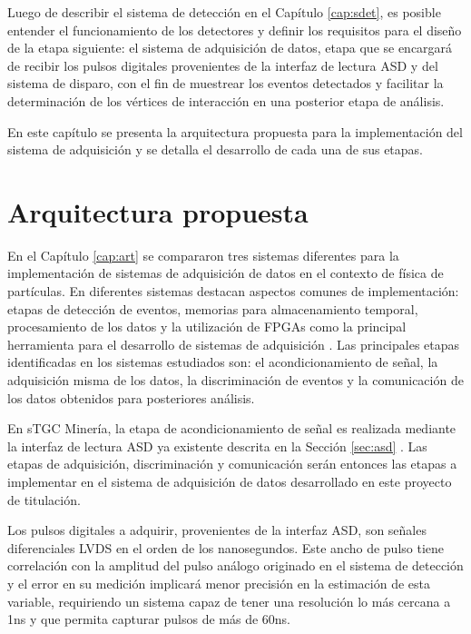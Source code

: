 Luego de describir el sistema de detección en el Capítulo \ref{cap:sdet}, es posible entender el funcionamiento de los detectores y definir los requisitos para el diseño de la etapa siguiente: el sistema de adquisición de datos, etapa que se encargará de recibir los pulsos digitales provenientes de la interfaz de lectura ASD y del sistema de disparo, con el fin de muestrear los eventos detectados y facilitar la determinación de los vértices de interacción en una posterior etapa de análisis.

En este capítulo se presenta la arquitectura propuesta para la implementación del sistema de adquisición y se detalla el desarrollo de cada una de sus etapas.

\section{Arquitectura propuesta}
\label{sec:arq}

	En el Capítulo \ref{cap:art} se compararon tres sistemas diferentes para la implementación de sistemas de adquisición de datos en el contexto de física de partículas. En diferentes sistemas destacan aspectos comunes de implementación: etapas de detección de eventos, memorias para almacenamiento temporal, procesamiento de los datos y la utilización de FPGAs como la principal herramienta para el desarrollo de sistemas de adquisición . Las principales etapas identificadas en los sistemas estudiados son: el acondicionamiento de señal, la adquisición misma de los datos, la discriminación de eventos y la comunicación de los datos obtenidos para posteriores análisis.
	
	En sTGC Minería, la etapa de acondicionamiento de señal es realizada mediante la interfaz de lectura ASD ya existente descrita en la Sección \ref{sec:asd} . Las etapas de adquisición, discriminación y comunicación serán entonces las etapas a implementar en el sistema de adquisición de datos desarrollado en este proyecto de titulación.
	
	Los pulsos digitales a adquirir, provenientes de la interfaz ASD, son señales diferenciales LVDS en el orden de los nanosegundos\cite{1999ATLASICs}. Este ancho de pulso tiene correlación con la amplitud del pulso análogo originado en el sistema de detección y el error en su medición implicará menor precisión en la estimación de esta variable, requiriendo un sistema capaz de tener una resolución lo más cercana a 1ns y que permita capturar pulsos de más de 60ns. 
	
